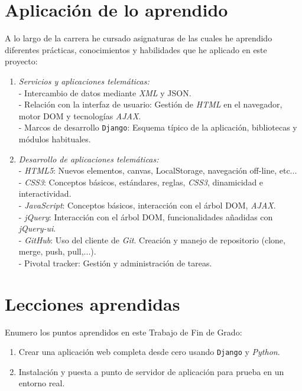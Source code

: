 \documentclass[a4paper, 12pt]{book}
\begin{document}
\section{Aplicaci\'on de lo aprendido}
\label{sec:aplicacion}
A lo largo de la carrera he cursado asignaturas de las cuales he aprendido diferentes pr\'acticas, conocimientos y habilidades que he aplicado en este proyecto:
\begin{enumerate}
  \item \textit{Servicios y aplicaciones telem\'aticas:}\\
  - Intercambio de datos mediante \textit{XML} y JSON.\\
  - Relaci\'on con la interfaz de usuario: Gesti\'on de \textit{HTML} en el navegador, motor DOM y tecnolog\'ias \textit{AJAX}.\\
  - Marcos de desarrollo \texttt{Django}: Esquema t\'ipico de la aplicaci\'on, bibliotecas y m\'odulos habituales.
  \item \textit{Desarrollo de aplicaciones telem\'aticas:}\\
  - \textit{HTML5}: Nuevos elementos, canvas, LocalStorage, navegaci\'on off-line, etc...\\
  - \textit{CSS3}: Conceptos b\'asicos, est\'andares, reglas, \textit{CSS3}, dinamicidad e interactividad.\\
  - \textit{JavaScript}: Conceptos b\'asicos, interacci\'on con el \'arbol DOM, \textit{AJAX}.\\
  - \textit{jQuery}: Interacci\'on con el \'arbol DOM, funcionalidades a\~nadidas con \textit{jQuery-ui}.\\
  - \textit{GitHub}: Uso del cliente de \textit{Git}. Creaci\'on y manejo de repositorio (clone, merge, push, pull,...).\\
  - Pivotal tracker: Gesti\'on y administraci\'on de tareas.\\
\end{enumerate}


\section{Lecciones aprendidas}
\label{sec:lecciones_aprendidas}
Enumero los puntos aprendidos en este Trabajo de Fin de Grado:
\begin{enumerate}
  \item Crear una aplicaci\'on web completa desde cero usando \texttt{Django} y \textit{Python}.
  \item Instalaci\'on y puesta a punto de servidor de aplicaci\'on para prueba en un entorno real.
\end{enumerate}
\end{document}

